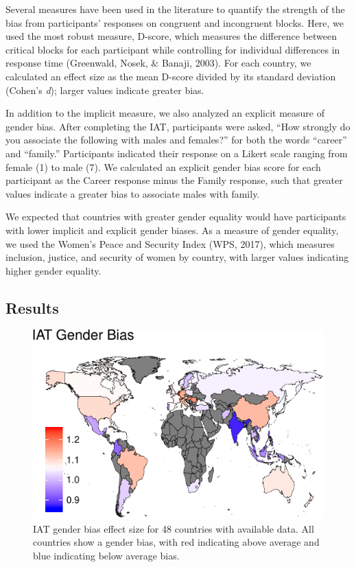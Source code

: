 \documentclass[10pt, letterpaper]{article}
\newenvironment{CodeChunk}{}{}
\begin{document}
Several measures have been used in the literature to quantify the
strength of the bias from participants' responses on congruent and
incongruent blocks. Here, we used the most robust measure, D-score,
which measures the difference between critical blocks for each
participant while controlling for individual differences in response
time (Greenwald, Nosek, \& Banaji, 2003). For each country, we
calculated an effect size as the mean D-score divided by its standard
deviation (Cohen's \emph{d}); larger values indicate greater bias.

In addition to the implicit measure, we also analyzed an explicit
measure of gender bias. After completing the IAT, participants were
asked, ``How strongly do you associate the following with males and
females?'' for both the words ``career'' and ``family.'' Participants
indicated their response on a Likert scale ranging from female (1) to
male (7). We calculated an explicit gender bias score for each
participant as the Career response minus the Family response, such that
greater values indicate a greater bias to associate males with family.

We expected that countries with greater gender equality would have
participants with lower implicit and explicit gender biases. As a
measure of gender equality, we used the Women's Peace and Security Index
(WPS, 2017), which measures inclusion, justice, and security of women by
country, with larger values indicating higher gender equality.

\subsection{Results}\label{results}

\begin{CodeChunk}
\begin{figure}[t]

{\centering \includegraphics{figs/country_gender_bias_map-1} 

}

\caption[IAT gender bias effect size for 48 countries with available data]{IAT gender bias effect size for 48 countries with available data. All countries show a gender bias, with red indicating above average and blue indicating below average bias.}\label{fig:country_gender_bias_map}
\end{figure}
\end{CodeChunk}
\end{document}
